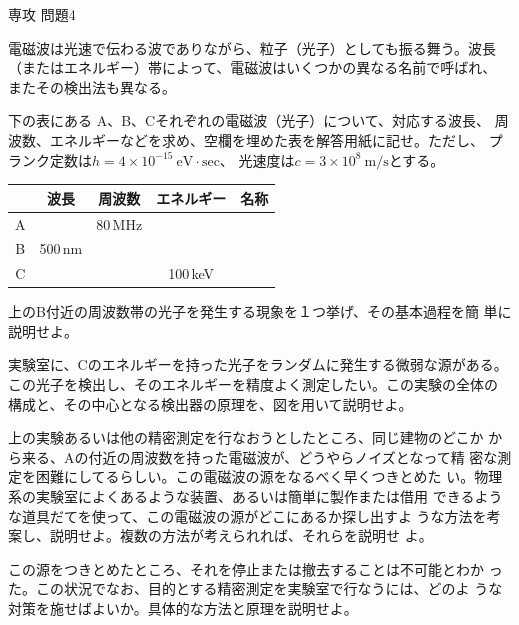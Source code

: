 \documentclass[fleqn]{jbook}
\begin{document}
\begin{question}{専攻 問題4}{}

電磁波は光速で伝わる波でありながら、粒子（光子）としても振る舞う。波長
（またはエネルギー）帯によって、電磁波はいくつかの異なる名前で呼ばれ、
またその検出法も異なる。

\begin{subquestions}
\SubQuestion
  下の表にある A、B、Cそれぞれの電磁波（光子）について、対応する波長、
  周波数、エネルギーなどを求め、空欄を埋めた表を解答用紙に記せ。ただし、
  プランク定数は$h = 4 \times 10^{-15}\ \mathrm{eV \cdot sec}$、
  光速度は$c = 3 \times 10^{8}\ \mathrm{m / s}$とする。

  \begin{tabular}{|c|c|c|c|c|}
    \hline
      	&    波長 	&   周波数	&   エネルギー 	&     名称	\\
    \hline \hline
     A	& 		&   80\,MHz	& \hspace{25mm}	& \hspace{20mm}	\\
    \hline
     B 	&    500\,nm	& 		& 		&		\\
    \hline
     C 	& 		& 		&   100\,keV	&		\\
    \hline
  \end{tabular}

\SubQuestion
  上のB付近の周波数帯の光子を発生する現象を１つ挙げ、その基本過程を簡
  単に説明せよ。

\SubQuestion
  実験室に、Cのエネルギーを持った光子をランダムに発生する微弱な源がある。
  この光子を検出し、そのエネルギーを精度よく測定したい。この実験の全体の
  構成と、その中心となる検出器の原理を、図を用いて説明せよ。

\SubQuestion
  上の実験あるいは他の精密測定を行なおうとしたところ、同じ建物のどこか
  から来る、Aの付近の周波数を持った電磁波が、どうやらノイズとなって精
  密な測定を困難にしてるらしい。この電磁波の源をなるべく早くつきとめた
  い。物理系の実験室によくあるような装置、あるいは簡単に製作または借用
  できるような道具だてを使って、この電磁波の源がどこにあるか探し出すよ
  うな方法を考案し、説明せよ。複数の方法が考えられれば、それらを説明せ
  よ。

\SubQuestion
  この源をつきとめたところ、それを停止または撤去することは不可能とわか
  った。この状況でなお、目的とする精密測定を実験室で行なうには、どのよ
  うな対策を施せばよいか。具体的な方法と原理を説明せよ。


\end{subquestions}
\end{question}
\end{document}
